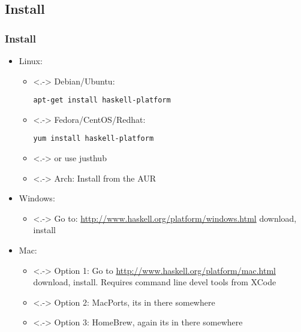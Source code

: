 \subsection{Install}
\begin{frame}[t,fragile]
	\frametitle{Install}
    \begin{itemize}[<+->]
		\item Linux:
            \begin{itemize}
                \item<.-> Debian/Ubuntu: \begin{verbatim}apt-get install haskell-platform\end{verbatim}

                \item<.-> Fedora/CentOS/Redhat: \begin{verbatim}yum install haskell-platform\end{verbatim}
                \item<.-> or use justhub

                \item<.-> Arch: Install from the AUR
            \end{itemize}

        \item Windows:
            \begin{itemize}
                \item<.-> Go to: \url{http://www.haskell.org/platform/windows.html} download,
                    install
            \end{itemize}

        \item Mac:
            \begin{itemize}
                \item<.-> Option 1: Go to \url{http://www.haskell.org/platform/mac.html} download,
                    install. Requires command line devel tools from XCode

                \item<.-> Option 2: MacPorts, its in there somewhere

                \item<.-> Option 3: HomeBrew, again its in there somewhere
            \end{itemize}
	\end{itemize}
\end{frame}

